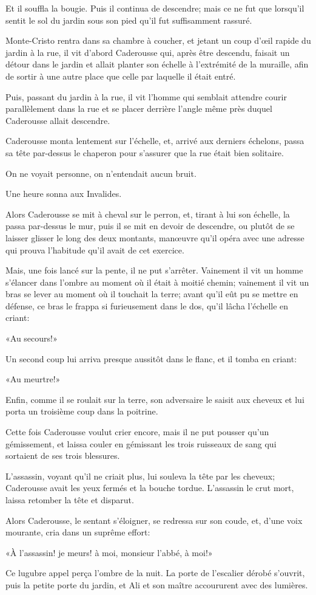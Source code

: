 Et il souffla la bougie. Puis il continua de descendre; mais ce ne fut que lorsqu'il sentit le sol du jardin sous son pied qu'il fut suffisamment rassuré. 

Monte-Cristo rentra dans sa chambre à coucher, et jetant un coup d'œil rapide du jardin à la rue, il vit d'abord Caderousse qui, après être descendu, faisait un détour dans le jardin et allait planter son échelle à l'extrémité de la muraille, afin de sortir à une autre place que celle par laquelle il était entré. 

Puis, passant du jardin à la rue, il vit l'homme qui semblait attendre courir parallèlement dans la rue et se placer derrière l'angle même près duquel Caderousse allait descendre. 

Caderousse monta lentement sur l'échelle, et, arrivé aux derniers échelons, passa sa tête par-dessus le chaperon pour s'assurer que la rue était bien solitaire. 

On ne voyait personne, on n'entendait aucun bruit. 

Une heure sonna aux Invalides. 

Alors Caderousse se mit à cheval sur le perron, et, tirant à lui son échelle, la passa par-dessus le mur, puis il se mit en devoir de descendre, ou plutôt de se laisser glisser le long des deux montants, manœuvre qu'il opéra avec une adresse qui prouva l'habitude qu'il avait de cet exercice. 

Mais, une fois lancé sur la pente, il ne put s'arrêter. Vainement il vit un homme s'élancer dans l'ombre au moment où il était à moitié chemin; vainement il vit un bras se lever au moment où il touchait la terre; avant qu'il eût pu se mettre en défense, ce bras le frappa si furieusement dans le dos, qu'il lâcha l'échelle en criant: 

«Au secours!» 

Un second coup lui arriva presque aussitôt dans le flanc, et il tomba en criant: 

«Au meurtre!» 

Enfin, comme il se roulait sur la terre, son adversaire le saisit aux cheveux et lui porta un troisième coup dans la poitrine. 

Cette fois Caderousse voulut crier encore, mais il ne put pousser qu'un gémissement, et laissa couler en gémissant les trois ruisseaux de sang qui sortaient de ses trois blessures. 

L'assassin, voyant qu'il ne criait plus, lui souleva la tête par les cheveux; Caderousse avait les yeux fermés et la bouche tordue. L'assassin le crut mort, laissa retomber la tête et disparut. 

Alors Caderousse, le sentant s'éloigner, se redressa sur son coude, et, d'une voix mourante, cria dans un suprême effort: 

«À l'assassin! je meurs! à moi, monsieur l'abbé, à moi!» 

Ce lugubre appel perça l'ombre de la nuit. La porte de l'escalier dérobé s'ouvrit, puis la petite porte du jardin, et Ali et son maître accoururent avec des lumières. 